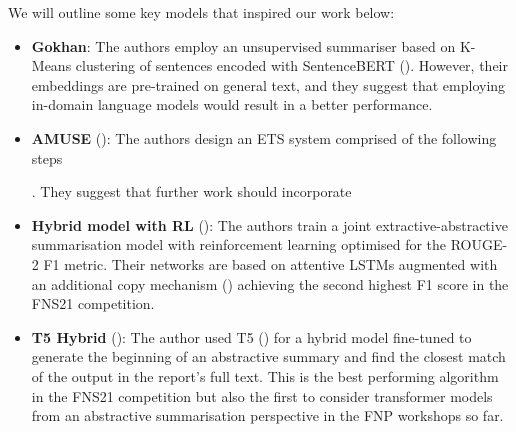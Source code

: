 We will outline some key models that inspired our work below:
\begin{itemize}
    \item \textbf{Gokhan}: The authors employ an unsupervised summariser based on K-Means clustering of sentences encoded with SentenceBERT (\cite{reimers2019sentence}).
    However, their embeddings are pre-trained on general text, and they suggest that employing in-domain language models would result in a better performance.

    \item \textbf{AMUSE} (\cite{litvak-vanetik-2021-summarization}): The authors design an ETS system comprised of the following steps .
    They suggest that further work should incorporate 

    \item \textbf{Hybrid model with RL} (\cite{zmandar-etal-2021-joint}): The authors train a joint extractive-abstractive summarisation model with reinforcement learning optimised for the ROUGE-2 F1 metric.
    Their networks are based on attentive LSTMs augmented with an additional copy mechanism (\cite{vinyals2015pointer}) achieving the second highest F1 score in the FNS21 competition.

    \item \textbf{T5 Hybrid} (\cite{orzhenovskii-2021-t5}): The author used T5 (\cite{rayson2019t5}) for a hybrid model fine-tuned to generate the beginning of an abstractive summary and find the closest match of the output in the report’s full text.
    This is the best performing algorithm in the FNS21 competition but also the first to consider transformer models from an abstractive summarisation perspective in the FNP workshops so far.

\end{itemize}

